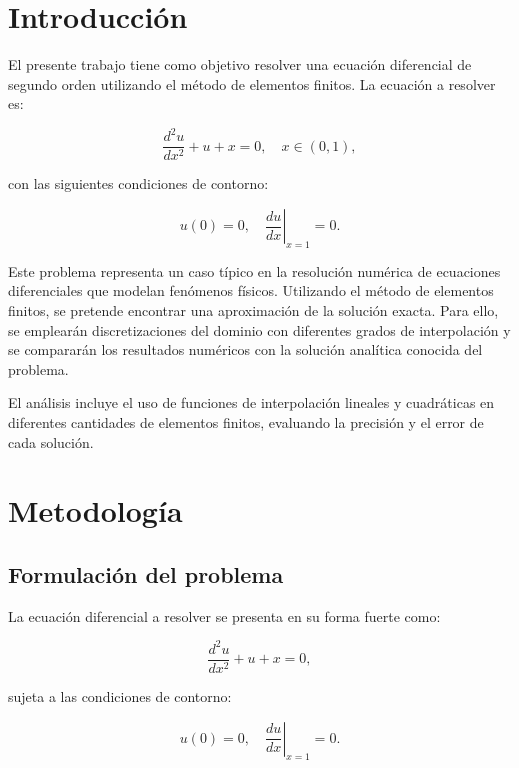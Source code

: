 \chapter{Introducción}

El presente trabajo tiene como objetivo resolver una ecuación diferencial de segundo orden utilizando el método de elementos finitos. La ecuación a resolver es:

\begin{equation}
\frac{d^2 u}{dx^2} + u + x = 0, \quad x \in (0,1),
\end{equation}

con las siguientes condiciones de contorno:

\begin{equation}
u(0) = 0, \quad \left. \frac{du}{dx} \right|_{x=1} = 0.
\end{equation}

Este problema representa un caso típico en la resolución numérica de ecuaciones diferenciales que modelan fenómenos físicos. Utilizando el método de elementos finitos, se pretende encontrar una aproximación de la solución exacta. Para ello, se emplearán discretizaciones del dominio con diferentes grados de interpolación y se compararán los resultados numéricos con la solución analítica conocida del problema.

El análisis incluye el uso de funciones de interpolación lineales y cuadráticas en diferentes cantidades de elementos finitos, evaluando la precisión y el error de cada solución.

\chapter{Metodología}

\section{Formulación del problema}

La ecuación diferencial a resolver se presenta en su forma fuerte como:

\begin{equation}
\frac{d^2 u}{dx^2} + u + x = 0,
\end{equation}

sujeta a las condiciones de contorno:

\begin{equation}
u(0) = 0, \quad \left. \frac{du}{dx} \right|_{x=1} = 0.
\end{equation}

